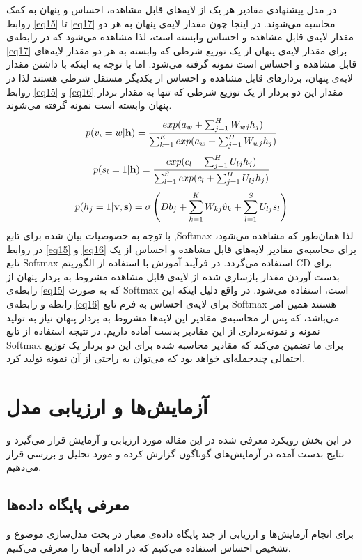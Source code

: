 \documentclass[12pt,a4paper]{article}
\begin{document}
در مدل پیشنهادی مقادیر هر یک از لایه‌های قابل مشاهده، احساس و پنهان به کمک روابط
\ref{eq15}
تا
\ref{eq17}
محاسبه می‌شوند. در اینجا چون مقدار لایه‌ی پنهان به هر دو مقدار لایه‌ی قابل مشاهده و احساس وابسته است، لذا مشاهده می‌‌شود که در رابطه‌ی
\ref{eq17}
برای مقدار لایه‌ی پنهان از یک توزیع شرطی که وابسته به هر دو مقدار لایه‌های قابل مشاهده و احساس است نمونه گرفته می‌‌شود. اما با توجه به اینکه با داشتن مقدار لایه‌ی پنهان، بردارهای قابل مشاهده و احساس از یکدیگر مستقل شرطی هستند لذا در روابط
\ref{eq15}
و
\ref{eq16}
مقدار این دو بردار از یک توزیع شرطی که تنها به مقدار بردار
پنهان وابسته است نمونه گرفته می‌‌شوند.
\begin{align}
\centering
\label{eq15}
p(v_{i}=w|\textbf{h})=\dfrac{exp(a_{w}+\sum_{j=1}^{H}W_{wj}h_j)}{\sum_{k=1}^{K}exp(a_{w}+\sum_{j=1}^{H}W_{wj}h_j)}
\end{align}
\begin{align}
\centering
\label{eq16}
p(s_{l}=1|\textbf{h})=\dfrac{exp(c_{l}+\sum_{j=1}^{H}U_{lj}h_j)}{\sum_{l=1}^{S}exp(c_{l}+\sum_{j=1}^{H}U_{lj}h_j)}
\end{align}
\begin{align}
\centering
\label{eq17}
p(h_{j}=1|\textbf{v},\textbf{s})=\sigma \left( Db_j + \sum_{k=1}^{K}W_{kj}\hat{v}_k + \sum_{l=1}^{S}U_{lj}s_l \right)
\end{align}
با توجه به خصوصیات بیان شده برای تابع ,Softmax لذا همان‌طور که مشاهده می‌‌شود، در روابط
\ref{eq15}
و
\ref{eq16}
برای محاسبه‌ی مقادیر لایه‌های قابل مشاهده و احساس از یک تابع Softmax استفاده می‌‌گردد. در فرآیند آموزش با استفاده از الگوریتم CD
برای بدست آوردن مقدار بازسازی شده از لایه‌ی قابل مشاهده مشروط به بردار پنهان
از رابطه‌ی
\ref{eq15}
که به صورت Softmax است، استفاده می‌‌شود. در واقع دلیل اینکه این رابطه و رابطه‌ی
\ref{eq16}
برای لایه‌ی احساس به فرم تابع Softmax
هستند همین امر می‌‌باشد، که پس از محاسبه‌ی مقادیر این لایه‌ها مشروط به بردار پنهان نیاز به تولید نمونه و نمونه‌برداری از این مقادیر بدست آماده داریم. در نتیجه استفاده از تابع Softmax برای ما تضمین می‌‌کند که مقادیر محاسبه شده برای این دو بردار یک توزیع احتمالی‌ چندجمله‌ای خواهد بود که می‌‌توان به راحتی‌ از آن نمونه تولید کرد.

\section{آزمایش‌ها و ارزیابی مدل}
\label{sec4}
در این بخش رویکرد معرفی‌ شده در این مقاله مورد  ارزیابی و آزمایش قرار می‌‌گیرد و نتایج بدست آمده در آزمایش‌های گوناگون 
گزارش کرده و مورد تحلیل و بررسی‌ قرار می‌‌دهیم.
\subsection{معرفی پایگاه داده‌ها}
\label{sec4-1}
برای انجام آزمایش‌ها و ارزیابی از چند پایگاه داده‌ی معبار در بحث مدل‌سازی موضوع و تشخیص احساس استفاده می‌کنیم که در ادامه آن‌ها را معرفی می‌کنیم.
\end{document}
